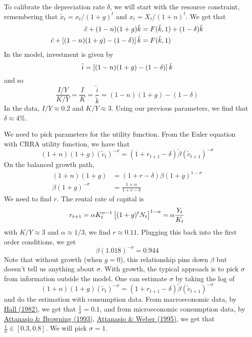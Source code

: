 \documentclass[10pt]{article}
\begin{document}
\begin{example}
To calibrate the depreciation rate $\delta$, we will start with the resource constraint, remembering that $\tilde{x}_t = x_t / (1+g)^t$ and $x_t = X_t / (1+n)^t$. We get that
\begin{align*}
	\tilde{c} + (1-n)(1+g) \tilde{k} &= F(\tilde{k},1) + (1-\delta) \tilde{k} \\
	\tilde{c} + \left[ (1-n)(1+g) - (1-\delta)\right] \tilde{k} &= F(\tilde{k},1)
\end{align*}
In the model, investment is given by
\[
\tilde{i} = \left[ (1-n)(1+g) - (1-\delta)\right] \tilde{k}
\]
and so
\[
\frac{I / Y}{K / Y} = \frac{I}{K} = \frac{\tilde{i}}{\tilde{k}} = (1-n)(1+g) - (1-\delta)
\]
In the data, $I / Y \approx 0.2$ and $K / Y \approx 3$. Using our previous parameters, we find that $\delta \approx 4\%$.

We need to pick parameters for the utility function. From the Euler equation with CRRA utility function, we have that
\[
(1+n)(1+g) (\tilde{c}_t)^{-\sigma} = (1 + r_{t+1}- \delta) \tilde{\beta}(\tilde{c}_{t+1})^{-\sigma}
\]
On the balanced growth path,
\begin{align*}
	(1+n)(1+g) &= (1 + r - \delta) \beta (1 + g)^{1-\sigma} \\
	\beta(1+g)^{-\sigma} &= \frac{1+n}{1 + r - \delta}
\end{align*}
We need to find $r$. The rental rate of capital is
\[
r_{t+1} = \alpha K_t^{\alpha - 1} \left[ (1 + g)^t N_t\right]^{1 - \alpha} = \alpha \frac{Y_t}{K_t}
\]
with $K / Y \approx 3$ and $\alpha \approx 1/3$, we find $r \approx 0.11$. Plugging this back into the first order conditions, we get
\[
\beta (1.018)^{-\sigma} = 0.944
\]
Note that without growth (\ie when $g = 0$), this relationship pins down $\beta$ but doesn't tell us anything about $\sigma$. With growth, the typical approach is to pick $\sigma$ from information outside the model. One can estimate $\sigma$ by taking the log of
\[
(1+n)(1+g) (\tilde{c}_t)^{-\sigma} = (1 + r_{t+1}- \delta) \tilde{\beta}(\tilde{c}_{t+1})^{-\sigma}
\]
and do the estimation with consumption data. From macroeconomic data, by \href{https://web.stanford.edu/~rehall/Sensitivity-Econometrica-Mar-1982.pdf}{Hall (1982)}, we get that $\frac{1}{\sigma} = 0.1$, and from microeconomic consumption data, by \href{https://www.jstor.org/stable/2950978}{Attanasio \& Browning (1993)}, \href{https://www.jstor.org/stable/2138706}{Attanasio \& Weber (1995)}, we get that $\frac{1}{\sigma} \in [0.3,0.8]$. We will pick $\sigma = 1$.


\end{example}
\end{document}
